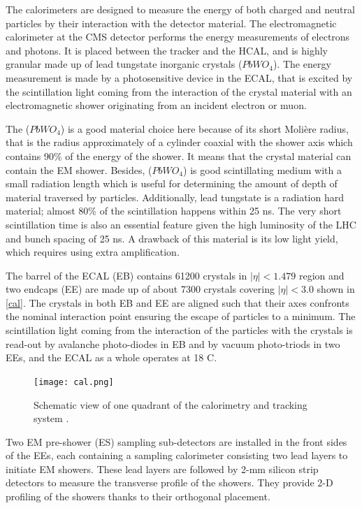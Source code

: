 The calorimeters are designed to measure the energy of both charged and neutral particles by their interaction with the detector material. The electromagnetic calorimeter at the CMS detector \cite{CERN-LHCC-97-033} performs the energy measurements of electrons and photons. It is placed between the tracker and the HCAL, and is highly granular made up of lead tungstate inorganic crystals ($PbWO_4$). The energy measurement is made by a photosensitive device in the ECAL, that is excited by the scintillation light coming from the interaction of the crystal material with an electromagnetic shower originating from an incident electron or muon.

The ($PbWO_4$) is a good material choice here because of its short Moli\`ere radius, that is the radius approximately of a cylinder coaxial with the shower axis which contains 90\% of the energy of the shower. It means that the crystal material can contain the EM shower. Besides, ($PbWO_4$) is good scintillating medium with a small radiation length which is useful for determining the amount of depth of material traversed by particles. Additionally, lead tungstate is a radiation hard material; almost 80\% of the scintillation happens within 25 ns. The very short scintillation time is also an essential feature given the high luminosity of the LHC and bunch spacing of 25 ns. A drawback of this material is its low light yield, which requires using extra amplification.

The barrel of the ECAL (EB) contains 61200 crystals in $|\eta|<1.479$ region and two endcaps (EE) are made up of about 7300 crystals covering $|\eta|<3.0$ shown in \autoref{cal}. The crystals in both EB and EE are aligned such that their axes confronts the nominal interaction point ensuring the escape of particles to a minimum. The scintillation light coming from the interaction of the particles with the crystals is read-out by avalanche photo-diodes in EB and by vacuum photo-triods in two EEs, and the ECAL as a whole operates at 18 \textdegree C.

\begin{figure}[ht]
	\centering
	\texttt{[image: cal.png]}
	\vspace{2mm}
	\caption[Schematic view showing one quadrant of the calorimetry and tracking system.]{Schematic view of one quadrant of the calorimetry and tracking system \cite{CERN-LHCC-97-033}.}
	\label{cal}
\end{figure}

Two EM pre-shower (ES) sampling sub-detectors are installed in the front sides of the EEs, each containing a sampling calorimeter consisting two lead layers to initiate EM showers. These lead layers are followed by 2-mm silicon strip detectors to measure the transverse profile of the showers. They provide 2-D profiling of the showers thanks to their orthogonal placement.

